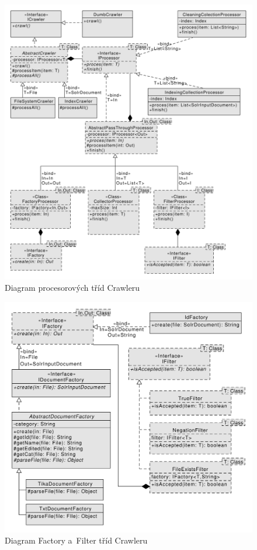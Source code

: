 \begin{figure}[h]
\begin{center}
\includegraphics[width=13cm]{ProcessorClasses}
\caption{Diagram procesorových tříd Crawleru}
\label{fig:ProcessorClasses}
\end{center}
\end{figure}

\begin{figure}[h]
\begin{center}
\includegraphics[width=13cm]{OtherClasses}
\caption{Diagram Factory a~Filter tříd Crawleru}
\label{fig:OtherClasses}
\end{center}
\end{figure}

